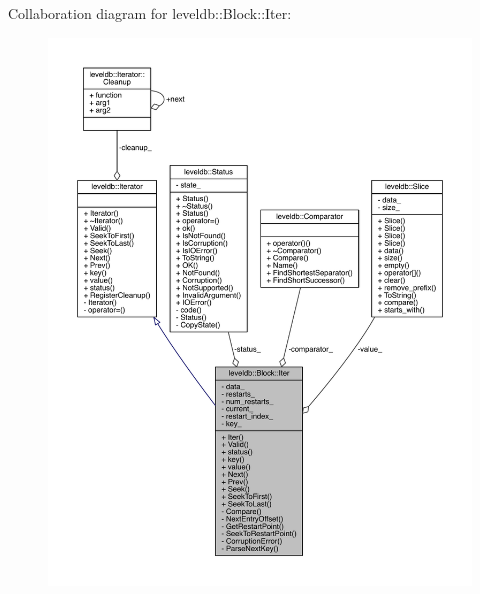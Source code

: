 Collaboration diagram for leveldb\+:\+:Block\+:\+:Iter\+:\nopagebreak
\begin{figure}[H]
\begin{center}
\leavevmode
\includegraphics[width=350pt]{classleveldb_1_1_block_1_1_iter__coll__graph}
\end{center}
\end{figure}
